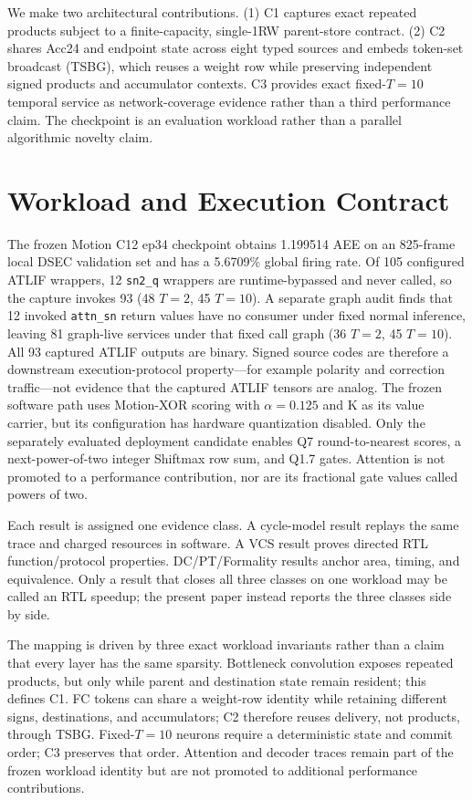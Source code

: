 \documentclass[conference]{IEEEtran}
\begin{document}
We make two architectural contributions.  (1) C1 captures exact repeated products subject
to a finite-capacity, single-1RW parent-store contract.  (2) C2 shares
Acc24 and endpoint state across eight typed sources and embeds token-set
broadcast (TSBG), which reuses a weight row while preserving independent signed
products and accumulator contexts.  C3 provides exact fixed-$T{=}10$ temporal
service as network-coverage evidence rather than a third performance claim.
The checkpoint is an evaluation workload rather than a parallel algorithmic
novelty claim.

\section{Workload and Execution Contract}
The frozen Motion C12 ep34 checkpoint obtains 1.199514 AEE on an 825-frame local DSEC validation set and
has a 5.6709\% global firing rate.  Of 105 configured ATLIF wrappers, 12
\texttt{sn2\_q} wrappers are runtime-bypassed and never called, so the capture
invokes 93 (48 $T{=}2$, 45 $T{=}10$).  A separate graph audit finds that 12
invoked \texttt{attn\_sn} return values have no consumer under fixed normal
inference, leaving 81 graph-live services under that fixed call graph
(36 $T{=}2$, 45 $T{=}10$).
All 93 captured ATLIF outputs are binary.  Signed source codes are therefore a downstream
execution-protocol property---for example polarity and correction traffic---not
evidence that the captured ATLIF tensors are analog.
The frozen software path uses Motion-XOR scoring with $\alpha{=}0.125$ and
K as its value carrier, but its configuration has hardware quantization
disabled.  Only the separately evaluated deployment candidate enables Q7 round-to-nearest
scores, a next-power-of-two integer Shiftmax row sum, and Q1.7 gates.
Attention is not promoted to a performance contribution, nor are its
fractional gate values called powers of two.

Each result is assigned one evidence class.  A cycle-model result replays the
same trace and charged resources in software.  A VCS result proves directed
RTL function/protocol properties.  DC/PT/Formality results anchor area, timing,
and equivalence.  Only a result that closes all three classes on one workload
may be called an RTL speedup; the present paper instead reports the three
classes side by side.

The mapping is driven by three exact workload invariants rather than a claim
that every layer has the same sparsity.  Bottleneck convolution exposes
repeated products, but only while parent and destination state remain resident;
this defines C1.  FC tokens can share a weight-row identity while retaining
different signs, destinations, and accumulators; C2 therefore reuses delivery,
not products, through TSBG.  Fixed-$T{=}10$ neurons require a deterministic
state and commit order; C3 preserves that order.  Attention and decoder traces
remain part of the frozen workload identity but are not promoted to additional
performance contributions.
\end{document}
